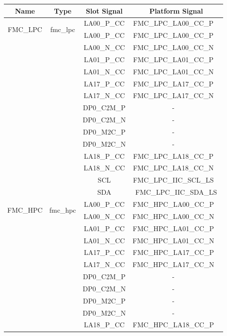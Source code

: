 \documentclass{article}
\begin{document}
\begin{longtable}[l]{|c|c|c|c|}
	\hline
	\rowcolor{blue}
	Name           & Type & Slot Signal & Platform Signal  \\
	\hline
	\multirow{2}{*}{FMC\_LPC} & \multirow{2}{*}{fmc\_lpc} & LA00\_P\_CC & FMC\_LPC\_LA00\_CC\_P \
	\\\cline{3-4}
	& & LA00\_P\_CC & FMC\_LPC\_LA00\_CC\_P \
	\\\cline{3-4}
	& & LA00\_N\_CC & FMC\_LPC\_LA00\_CC\_N \
	\\\cline{3-4}
	& & LA01\_P\_CC & FMC\_LPC\_LA01\_CC\_P \
	\\\cline{3-4}
	& & LA01\_N\_CC & FMC\_LPC\_LA01\_CC\_N \
	\\\cline{3-4}
	& & LA17\_P\_CC & FMC\_LPC\_LA17\_CC\_P \
	\\\cline{3-4}
	& & LA17\_N\_CC & FMC\_LPC\_LA17\_CC\_N \
	\\\cline{3-4}
	& & DP0\_C2M\_P & - \
	\\\cline{3-4}
	& & DP0\_C2M\_N & - \
	\\\cline{3-4}
	& & DP0\_M2C\_P & - \
	\\\cline{3-4}
	& & DP0\_M2C\_N & - \
	\\\cline{3-4}
	& & LA18\_P\_CC & FMC\_LPC\_LA18\_CC\_P \
	\\\cline{3-4}
	& & LA18\_N\_CC & FMC\_LPC\_LA18\_CC\_N \
	\\\cline{3-4}
	& & SCL & FMC\_LPC\_IIC\_SCL\_LS \
	\\\cline{3-4}
	& & SDA & FMC\_LPC\_IIC\_SDA\_LS \\
	\hline
	\multirow{2}{*}{FMC\_HPC} & \multirow{2}{*}{fmc\_hpc} & LA00\_P\_CC & FMC\_HPC\_LA00\_CC\_P \
	\\\cline{3-4}
	& & LA00\_N\_CC & FMC\_HPC\_LA00\_CC\_N \
	\\\cline{3-4}
	& & LA01\_P\_CC & FMC\_HPC\_LA01\_CC\_P \
	\\\cline{3-4}
	& & LA01\_N\_CC & FMC\_HPC\_LA01\_CC\_N \
	\\\cline{3-4}
	& & LA17\_P\_CC & FMC\_HPC\_LA17\_CC\_P \
	\\\cline{3-4}
	& & LA17\_N\_CC & FMC\_HPC\_LA17\_CC\_N \
	\\\cline{3-4}
	& & DP0\_C2M\_P & - \
	\\\cline{3-4}
	& & DP0\_C2M\_N & - \
	\\\cline{3-4}
	& & DP0\_M2C\_P & - \
	\\\cline{3-4}
	& & DP0\_M2C\_N & - \
	\\\cline{3-4}
	& & LA18\_P\_CC & FMC\_HPC\_LA18\_CC\_P \

\end{longtable}
\end{document}
